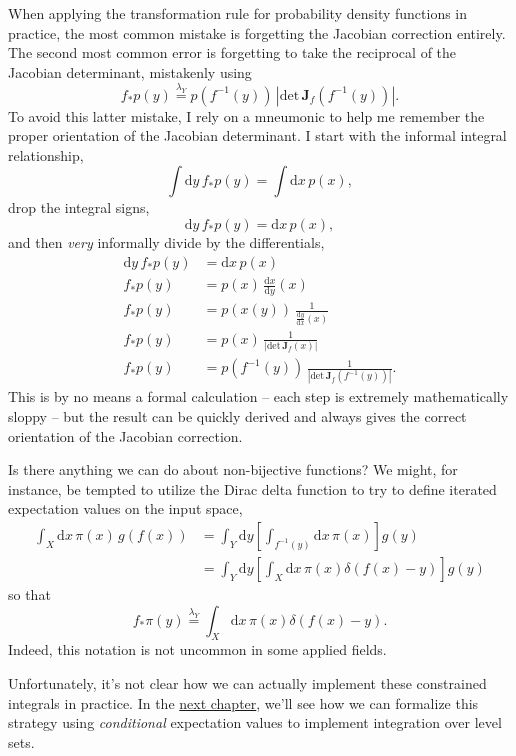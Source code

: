 \documentclass[
  letterpaper,
  DIV=11,
  numbers=noendperiod]{scrartcl}
\begin{document}
When applying the transformation rule for probability density functions
in practice, the most common mistake is forgetting the Jacobian
correction entirely. The second most common error is forgetting to take
the reciprocal of the Jacobian determinant, mistakenly using \[
f_{*} p(y)
\overset{\lambda_{Y}}{=}
p(f^{-1}(y)) \, | \mathrm{det} \, \mathbf{J}_{f}(f^{-1}(y)) |.
\] To avoid this latter mistake, I rely on a mneumonic to help me
remember the proper orientation of the Jacobian determinant. I start
with the informal integral relationship, \[
\int \mathrm{d} y \, f_{*} p(y) = \int \mathrm{d} x \, p(x),
\] drop the integral signs, \[
\mathrm{d} y \, f_{*} p(y) = \mathrm{d} x \, p(x),
\] and then \emph{very} informally divide by the differentials,
\begin{align*}
\mathrm{d} y \, f_{*} p(y) &= \mathrm{d} x \, p(x)
\\
f_{*} p(y)
&=
p(x) \, \frac{ \mathrm{d} x }{ \mathrm{d} y } (x)
\\
f_{*} p(y)
&=
p(x(y)) \, \frac{1}{ \frac{ \mathrm{d} y }{ \mathrm{d} x }(x) }
\\
f_{*} p(y)
&=
p(x) \, \frac{1}{ | \mathrm{det} \, \mathbf{J}_{f}(x) |}
\\
f_{*} p(y)
&=
p(f^{-1}(y)) \, \frac{1}{ | \mathrm{det} \, \mathbf{J}_{f}(f^{-1}(y)) |}.
\end{align*} This is by no means a formal calculation -- each step is
extremely mathematically sloppy -- but the result can be quickly derived
and always gives the correct orientation of the Jacobian correction.

Is there anything we can do about non-bijective functions? We might, for
instance, be tempted to utilize the Dirac delta function to try to
define iterated expectation values on the input space, \begin{align*}
\int_{X} \mathrm{d} x \, \pi(x) \, g(f(x))
&=
\int_{Y} \mathrm{d} y
\left[ \int_{f^{-1}(y)} \mathrm{d} x \, \pi(x) \right] g(y)
\\
&=
\int_{Y} \mathrm{d} y
\left[ \int_{X} \mathrm{d} x \, \pi(x) \delta( f(x) - y ) \right] g(y)
\end{align*} so that \[
f_{*} \pi(y) \overset{\lambda_{Y}}{=}
\int_{X} \mathrm{d} x \, \pi(x) \delta( f(x) - y ).
\] Indeed, this notation is not uncommon in some applied fields.

Unfortunately, it's not clear how we can actually implement these
constrained integrals in practice. In the
\href{http://www.symplectomorphic.com/assets/chapters_html/conditional_probability_theory_1.html}{next
chapter}, we'll see how we can formalize this strategy using
\emph{conditional} expectation values to implement integration over
level sets.
\end{document}
